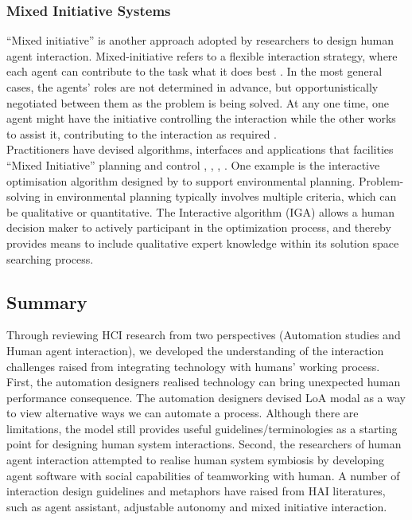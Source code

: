 \subsubsection{Mixed Initiative Systems}
``Mixed initiative'' is another approach adopted by researchers to design human agent interaction.  Mixed-initiative refers to a flexible interaction strategy, where each agent can contribute to the task what it does best \cite{Allen1999}. In the most general cases, the agents' roles are not determined in advance, but opportunistically negotiated between them as the problem is being solved. At any one time, one agent might have the initiative controlling the interaction while the other works to assist it, contributing to the interaction as required \cite{Horvitz1999}.\\

Practitioners have devised algorithms, interfaces and applications that facilities ``Mixed Initiative'' planning and control \cite{Ferguson1996}, \cite{Burstein2003}, \cite{Hardin2009}, \cite{Zimmerman2007} . One example is the interactive optimisation algorithm designed by \cite{Yang2012} to support environmental planning. Problem-solving in environmental planning typically involves multiple criteria, which can be qualitative or quantitative. The Interactive algorithm (IGA) allows a human decision maker to actively participant in the optimization process, and thereby provides means to include qualitative expert knowledge within its solution space searching process.\\


\subsection{Summary}
Through reviewing \ac{HCI} research from two perspectives (Automation studies and Human agent interaction), we developed the understanding of the interaction challenges raised from integrating technology with humans' working process.  First, the automation designers realised technology can bring unexpected human performance consequence. The automation designers devised \ac{LoA} modal as a way to view alternative ways we can automate a process. Although there are limitations, the model still provides useful guidelines/terminologies as a starting point for designing human system interactions. Second, the researchers of human agent interaction attempted to realise human system symbiosis by developing agent software with social capabilities of teamworking with human. A number of interaction design guidelines and metaphors have raised from \ac{HAI} literatures, such as agent assistant, adjustable autonomy and mixed initiative interaction.  \\ 


